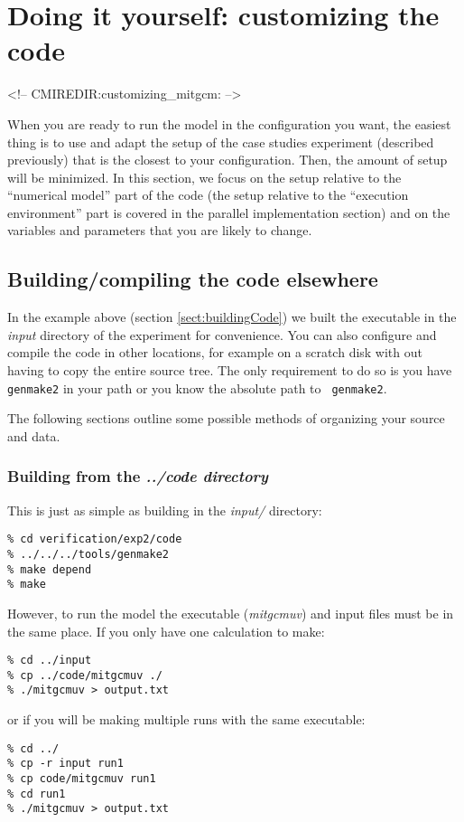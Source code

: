 \section[Customizing MITgcm]{Doing it yourself: customizing the code}
\label{sect:customize}
\begin{rawhtml}
<!-- CMIREDIR:customizing_mitgcm: -->
\end{rawhtml}

When you are ready to run the model in the configuration you want, the
easiest thing is to use and adapt the setup of the case studies
experiment (described previously) that is the closest to your
configuration. Then, the amount of setup will be minimized. In this
section, we focus on the setup relative to the ``numerical model''
part of the code (the setup relative to the ``execution environment''
part is covered in the parallel implementation section) and on the
variables and parameters that you are likely to change.


\subsection{Building/compiling the code elsewhere}

In the example above (section \ref{sect:buildingCode}) we built the
executable in the {\em input} directory of the experiment for
convenience. You can also configure and compile the code in other
locations, for example on a scratch disk with out having to copy the
entire source tree. The only requirement to do so is you have {\tt
  genmake2} in your path or you know the absolute path to {\tt
  genmake2}.

The following sections outline some possible methods of organizing
your source and data.

\subsubsection{Building from the {\em ../code directory}}

This is just as simple as building in the {\em input/} directory:
\begin{verbatim}
% cd verification/exp2/code
% ../../../tools/genmake2
% make depend
% make
\end{verbatim}
However, to run the model the executable ({\em mitgcmuv}) and input
files must be in the same place. If you only have one calculation to make:
\begin{verbatim}
% cd ../input
% cp ../code/mitgcmuv ./
% ./mitgcmuv > output.txt
\end{verbatim}
or if you will be making multiple runs with the same executable:
\begin{verbatim}
% cd ../
% cp -r input run1
% cp code/mitgcmuv run1
% cd run1
% ./mitgcmuv > output.txt
\end{verbatim}

